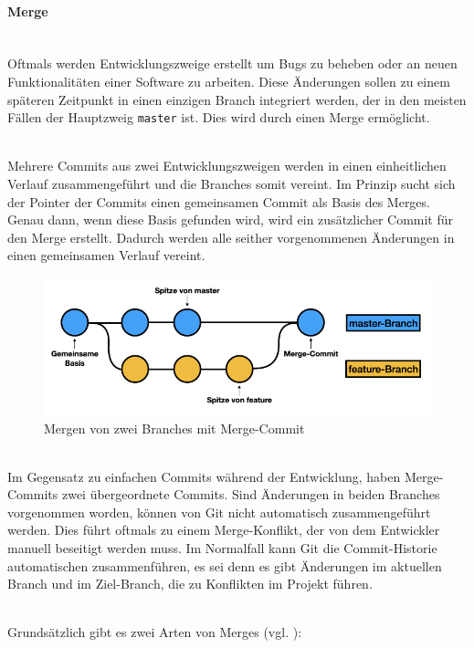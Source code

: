 \paragraph{Merge}\mbox{}\\
Oftmals werden Entwicklungszweige erstellt um Bugs zu beheben oder an neuen Funktionalitäten einer Software zu arbeiten. Diese Änderungen sollen zu einem späteren Zeitpunkt in einen einzigen Branch integriert werden, der in den meisten Fällen der Hauptzweig \texttt{master} ist. Dies wird durch einen Merge ermöglicht.

 \mbox{}\\
Mehrere Commits aus zwei Entwicklungszweigen werden in einen einheitlichen Verlauf zusammengeführt und die Branches somit vereint. Im Prinzip sucht sich der Pointer der Commits einen gemeinsamen Commit als Basis des Merges. Genau dann, wenn diese Basis gefunden wird, wird ein zusätzlicher Commit für den Merge erstellt. Dadurch werden alle seither vorgenommenen Änderungen in einen gemeinsamen Verlauf vereint.

\begin{figure}[H]
\begin{center}
	\includegraphics[scale=.8]{images/git-merge.png}
\end{center}
	\caption{Mergen von zwei Branches mit Merge-Commit}
\end{figure}

 \mbox{}\\
Im Gegensatz zu einfachen Commits während der Entwicklung, haben Merge-Commits zwei übergeordnete Commits. Sind Änderungen in beiden Branches vorgenommen worden, können von Git nicht automatisch zusammengeführt werden. Dies führt oftmals zu einem Merge-Konflikt, der von dem Entwickler manuell beseitigt werden muss. Im Normalfall kann Git die Commit-Historie automatischen zusammenführen, es sei denn es gibt Änderungen im aktuellen Branch und im Ziel-Branch, die zu Konflikten im Projekt führen.

 \mbox{}\\
Grundsätzlich gibt es zwei Arten von Merges (vgl. \cite{atlassian_git_merge_2021}):

